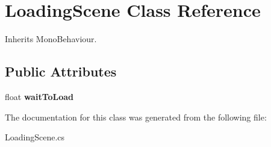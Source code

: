 \hypertarget{class_loading_scene}{}\section{Loading\+Scene Class Reference}
\label{class_loading_scene}


Inherits Mono\+Behaviour.

\subsection*{Public Attributes}
\begin{DoxyCompactItemize}
\item 
\mbox{\label{class_loading_scene_adf76d3eaa7c3cd6205c7333f7a4b6bca}} 
float {\bfseries wait\+To\+Load}
\end{DoxyCompactItemize}


The documentation for this class was generated from the following file\+:\begin{DoxyCompactItemize}
\item 
Loading\+Scene.\+cs\end{DoxyCompactItemize}
